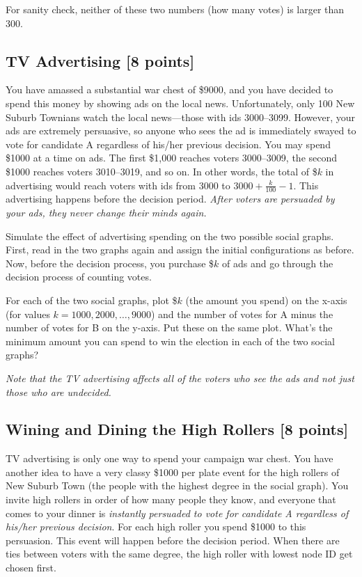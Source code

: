 For sanity check, neither of these two numbers (how many votes) is larger than 300.

\subsection{TV Advertising [8 points]}
You have amassed a substantial war chest of \$9000, and you have decided to
spend this money by showing ads on the local news. Unfortunately, only 100 New
Suburb Townians watch the local news---those with ids 3000--3099.  However, your
ads are extremely persuasive, so anyone who sees the ad is immediately swayed to
vote for candidate A regardless of his/her previous decision.  You may spend
\$1000 at a time on ads.  The first \$1,000 reaches voters 3000--3009, the
second \$1000 reaches voters 3010--3019, and so on. In other words, the total of \$$k$ in advertising would reach voters with ids from 3000 to $3000 + \frac{k}{100} - 1$.  This advertising happens
before the decision period.  \emph{After voters are persuaded by your ads, they
  never change their minds again.}

Simulate the effect of advertising spending on the two possible social
graphs. First, read in the two graphs again and assign the initial
configurations as before. Now, before the decision process, you purchase \$$k$
of ads and go through the decision process of counting votes.

For each of the two social graphs, plot \$$k$ (the amount you spend) on the
x-axis (for values $k = 1000, 2000, \ldots, 9000$) and the number of votes for A minus the number of votes for B on the y-axis.  Put these on the
same plot.  What's the minimum
amount you can spend to win the election in each of the two social graphs?

\emph{Note that the TV advertising affects all of the voters who see the ads and not just those who
  are undecided.}

\subsection{Wining and Dining the High Rollers [8 points]}
\label{cascades_3}
TV advertising is only one way to spend your campaign war chest.  You have
another idea to have a very classy \$1000 per plate event for the high rollers
of New Suburb Town (the people with the highest degree in the social graph). You
invite high rollers in order of how many people they know, and everyone that
comes to your dinner is \emph{instantly persuaded to vote for candidate A
  regardless of his/her previous decision}.  
For each high roller you spend \$1000 to this persuasion.  
This event will happen before the
decision period. When there are ties between voters with the same degree, the
high roller with lowest node ID get chosen first.

